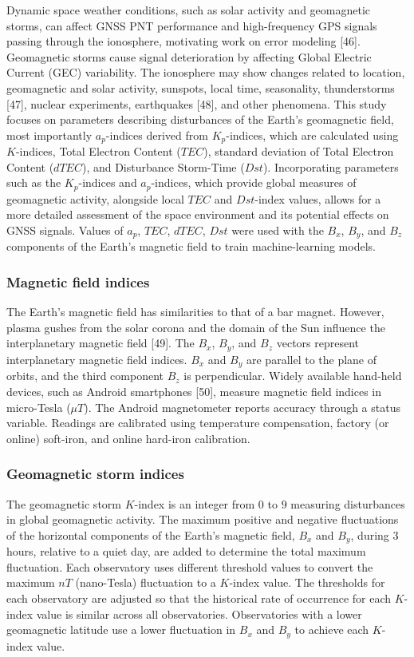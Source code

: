 \let\LaTeXcline\cline\documentclass[sn-mathphys-num]{sn-jnl}\let\cline\LaTeXcline
\begin{document}
Dynamic space weather conditions, such as solar activity and geomagnetic storms, can affect  GNSS PNT performance and high-frequency GPS signals passing through the ionosphere, motivating work on error modeling [46]. Geomagnetic storms cause signal deterioration by affecting Global Electric Current (GEC) variability. The ionosphere may show changes related to location, geomagnetic and solar activity, sunspots, local time, seasonality, thunderstorms [47], nuclear experiments, earthquakes [48], and other phenomena. This study focuses on parameters describing disturbances of the Earth's geomagnetic field, most importantly $a_{p}$-indices derived from $K_{p}$-indices, which are calculated using $K$-indices, Total Electron Content ($TEC$), standard deviation of Total Electron Content ($dTEC$), and Disturbance Storm-Time ($Dst$). Incorporating parameters such as the $K_{p}$-indices and $a_{p}$-indices, which provide global measures of geomagnetic activity, alongside local $TEC$ and $Dst$-index values, allows for a more detailed assessment of the space environment and its potential effects on GNSS signals. Values of $a_{p}$, $TEC$, $dTEC$, $Dst$ were used with the $B_x$, $B_y$, and $B_z$ components of the Earth's magnetic field to train machine-learning models.

\subsubsection{Magnetic field indices}

The Earth's magnetic field has similarities to that of a bar magnet. However, plasma gushes from the solar corona and the domain of the Sun influence the interplanetary magnetic field [49]. The $B_{x}$, $B_{y}$, and $B_{z}$ vectors represent interplanetary magnetic field indices. $B_{x}$ and $B_{y}$ are parallel to the plane of orbits, and the third component $B_{z}$ is perpendicular. Widely available hand-held devices, such as Android smartphones [50], measure magnetic field indices in micro-Tesla ($\mu T$). The Android magnetometer reports accuracy through a status variable. Readings are calibrated using temperature compensation, factory (or online) soft-iron, and online hard-iron calibration.
 
\subsubsection{Geomagnetic storm indices}

The geomagnetic storm $K$-index is an integer from $0$ to $9$ measuring disturbances in global geomagnetic activity. The maximum positive and negative fluctuations of the horizontal components of the Earth's magnetic field, $B_{x}$ and $B_{y}$, during $3$ hours, relative to a quiet day, are added to determine the total maximum fluctuation. Each observatory uses different threshold values to convert the maximum $nT$ (nano-Tesla) fluctuation to a $K$-index value. The thresholds for each observatory are adjusted so that the historical rate of occurrence for each $K$-index value is similar across all observatories. Observatories with a lower geomagnetic latitude use a lower fluctuation in $B_{x}$ and $B_{y}$ to achieve each $K$-index value.
\end{document}
